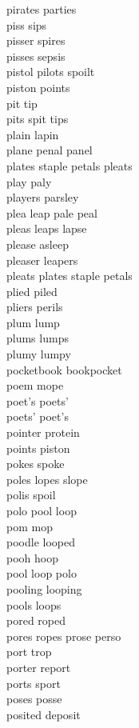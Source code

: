 pirates parties\\
piss sips\\
pisser spires\\
pisses sepsis\\
pistol pilots spoilt\\
piston points\\
pit tip\\
pits spit tips\\
plain lapin\\
plane penal panel\\
plates staple petals pleats\\
play paly\\
players parsley\\
plea leap pale peal\\
pleas leaps lapse\\
please asleep\\
pleaser leapers\\
pleats plates staple petals\\
plied piled\\
pliers perils\\
plum lump\\
plums lumps\\
plumy lumpy\\
pocketbook bookpocket\\
poem mope\\
poet's poets'\\
poets' poet's\\
pointer protein\\
points piston\\
pokes spoke\\
poles lopes slope\\
polis spoil\\
polo pool loop\\
pom mop\\
poodle looped\\
pooh hoop\\
pool loop polo\\
pooling looping\\
pools loops\\
pored roped\\
pores ropes prose perso\\
port trop\\
porter report\\
ports sport\\
poses posse\\
posited deposit\\
